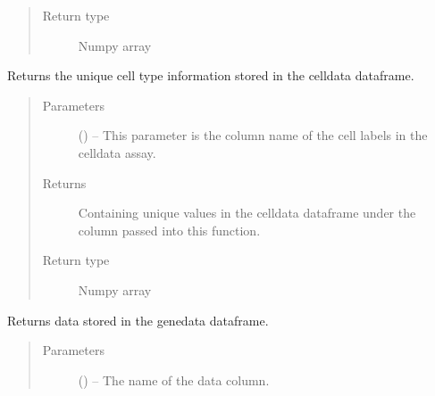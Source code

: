 \documentclass[letterpaper,10pt,english]{sphinxmanual}
\begin{document}
\begin{fulllineitems}
\begin{fulllineitems}
\begin{quote}
\begin{description}
\item[{Return type}] \leavevmode
Numpy array

\end{description}\end{quote}

\end{fulllineitems}


\begin{fulllineitems}
\label{\detokenize{index:singlecelldata.SingleCell.getDistinctCellTypes}}
Returns the unique cell type information stored in the celldata dataframe.
\begin{quote}\begin{description}
\item[{Parameters}] \leavevmode
{} () – This parameter is the column name of the cell labels in the celldata assay.

\item[{Returns}] \leavevmode
Containing unique values in the celldata dataframe under the column passed into
this function.

\item[{Return type}] \leavevmode
Numpy array

\end{description}\end{quote}

\end{fulllineitems}


\begin{fulllineitems}
\label{\detokenize{index:singlecelldata.SingleCell.getGeneData}}
Returns data stored in the genedata dataframe.
\begin{quote}\begin{description}
\item[{Parameters}] \leavevmode
{} () – The name of the data column.


\end{description}
\end{quote}
\end{fulllineitems}
\end{fulllineitems}
\end{document}
